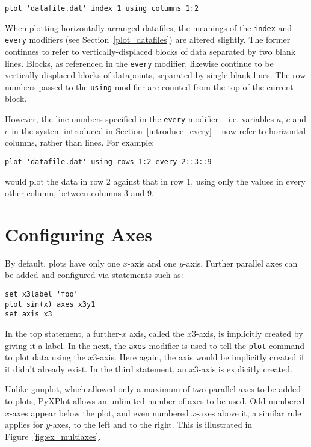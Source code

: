 \begin{verbatim}
plot 'datafile.dat' index 1 using columns 1:2
\end{verbatim}

When plotting horizontally-arranged datafiles, the meanings of the
\texttt{index} and \texttt{every} modifiers (see Section~\ref{plot_datafiles})
are altered slightly. The former continues to refer to vertically-displaced
blocks of data separated by two blank lines.  Blocks, as referenced in the
\texttt{every} modifier, likewise continue to be vertically-displaced blocks of
datapoints, separated by single blank lines. The row numbers passed to the
\texttt{using} modifier are counted from the top of the current block.

However, the line-numbers specified in the \texttt{every} modifier -- i.e.
variables $a$, $c$ and $e$ in the system introduced in
Section~\ref{introduce_every} -- now refer to horizontal columns, rather than
lines. For example:

\begin{verbatim}
plot 'datafile.dat' using rows 1:2 every 2::3::9
\end{verbatim}

\noindent would plot the data in row 2 against that in row 1, using only the
values in every other column, between columns 3 and 9.

\section{Configuring Axes}
\label{axis_extensions}\label{ranges_multiaxes}\label{multiple_axes}

By default, plots have only one $x$-axis and one $y$-axis. Further parallel
axes can be added and configured via statements such as:

\begin{verbatim}
set x3label 'foo'
plot sin(x) axes x3y1
set axis x3
\end{verbatim}

\noindent In the top statement, a further-$x$ axis, called the $x3$-axis, is
implicitly created by giving it a label. In the next, the \texttt{axes}
modifier is used to tell the \texttt{plot} command to plot data using the
$x3$-axis. Here again, the axis would be implicitly created if it didn't
already exist.  In the third statement, an $x3$-axis is explicitly created.

Unlike gnuplot, which allowed only a maximum of two parallel axes to be added
to plots, PyXPlot allows an unlimited number of axes to be used. Odd-numbered
$x$-axes appear below the plot, and even numbered $x$-axes above it; a similar
rule applies for $y$-axes, to the left and to the right. This is illustrated in
Figure~\ref{fig:ex_multiaxes}.

